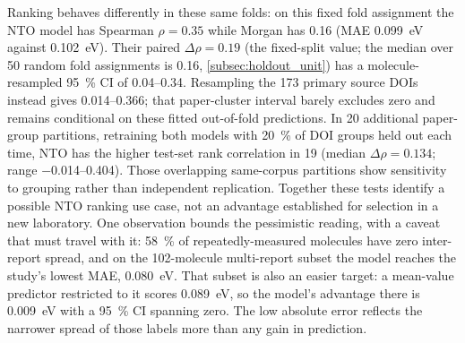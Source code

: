 Ranking behaves differently in these same folds: on this fixed fold assignment the NTO model has Spearman
$\rho = \num{0.35}$ while Morgan has \num{0.16} (MAE
\qty{0.099}{\electronvolt} against \qty{0.102}{\electronvolt}). Their paired
$\Delta\rho = \num{0.19}$ (the fixed-split value; the median over \num{50} random fold assignments is \num{0.16}, \cref{subsec:holdout_unit}) has a molecule-resampled \qty{95}{\percent} CI of
\numrange{0.04}{0.34}. Resampling the \num{173} primary source DOIs instead
gives \numrange{0.014}{0.366}; that paper-cluster interval barely excludes zero
and remains conditional on these fitted out-of-fold predictions. In \num{20}
additional paper-group partitions, retraining both models with \qty{20}{\percent}
of DOI groups held out each time, NTO has the higher test-set rank correlation
in \num{19} (median $\Delta\rho = \num{0.134}$; range
\numrange{-0.014}{0.404}). Those overlapping same-corpus partitions show
sensitivity to grouping rather than independent replication. Together these
tests identify a possible NTO ranking use case, not an advantage established
for selection in a new laboratory. One observation bounds the pessimistic reading, with a caveat that must travel with it:
\qty{58}{\percent} of repeatedly-measured molecules have zero inter-report spread, and
on the \num{102}-molecule multi-report subset the model reaches the study's lowest MAE,
\qty{0.080}{\electronvolt}. That subset is also an easier target: a mean-value predictor
restricted to it scores \qty{0.089}{\electronvolt}, so the model's advantage there is
\qty{0.009}{\electronvolt} with a \qty{95}{\percent} CI spanning zero. The low absolute
error reflects the narrower spread of those labels more than any gain in prediction.

